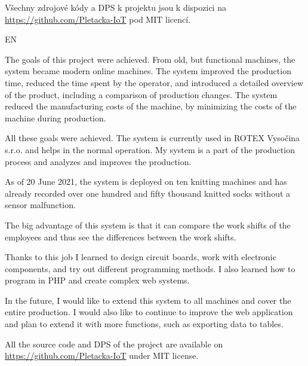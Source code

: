 \documentclass[12pt, a4paper]{article}
\begin{document}
Všechny zdrojové kódy a DPS k projektu jsou k dispozici na \url{https://github.com/Pletacka-IoT} pod MIT licencí.

EN

The goals of this project were achieved. From old, but functional machines, the system became modern online machines.
The system improved the production time, reduced the time spent by the operator, and introduced a detailed overview of the product, including a comparison of production changes.
The system reduced the manufacturing costs of the machine, by minimizing the costs of the machine during production.


All these goals were achieved.
The system is currently used in ROTEX Vysočina s.r.o. and helps in the normal operation.
My system is a part of the production process and analyzes and improves the production.

As of 20 June 2021, the system is deployed on ten knitting machines and has already recorded over one hundred and fifty thousand knitted socks without a sensor malfunction.

The big advantage of this system is that it can compare the work shifts of the employees and thus see the differences between the work shifts.

Thanks to this job I learned to design circuit boards, work with electronic components, and try out different programming methods.
I also learned how to program in PHP and create complex web systems.

In the future, I would like to extend this system to all machines and cover the entire production.
I would also like to continue to improve the web application and plan to extend it with more functions, such as exporting data to tables.

All the source code and DPS of the project are available on \url{https://github.com/Pletacka-IoT} under MIT license.


\newpage





\appendix
\end{document}
